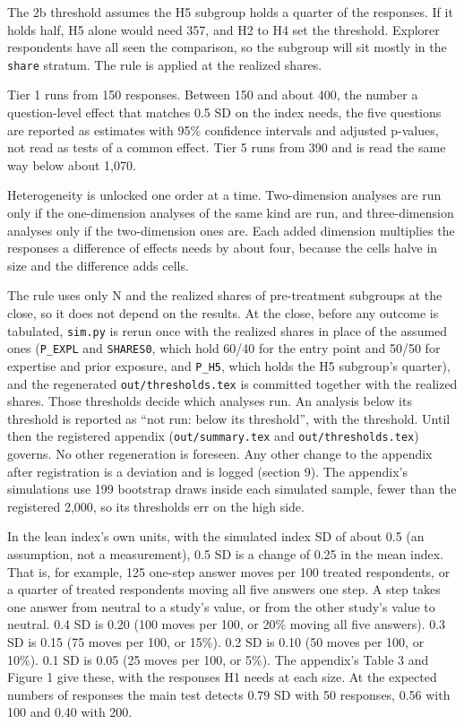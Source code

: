 The 2b threshold assumes the H5 subgroup holds a quarter of the responses. If it holds half, H5
alone would need 357, and H2 to H4 set the threshold. Explorer respondents have all seen the comparison, so the subgroup will sit
mostly in the \texttt{share} stratum. The rule is applied at the realized shares.

Tier 1 runs from 150 responses. Between 150 and about 400, the number a question-level effect that
matches 0.5 SD on the index needs, the five questions are reported as estimates with 95\%
confidence intervals and adjusted p-values, not read as tests of a common effect. Tier 5 runs from
390 and is read the same way below about 1,070.

Heterogeneity is unlocked one order at a time. Two-dimension analyses are run only if the
one-dimension analyses of the same kind are run, and three-dimension analyses only if the
two-dimension ones are. Each added dimension multiplies the responses a difference of effects
needs by about four, because the cells halve in size and the difference adds cells.

The rule uses only N and the realized shares of pre-treatment subgroups at the close, so it does
not depend on the results. At the close, before any outcome is tabulated, \texttt{sim.py} is rerun once
with the realized shares in place of the assumed ones (\texttt{P\_EXPL} and \texttt{SHARES0}, which hold 60/40
for the entry point and 50/50 for expertise and prior exposure, and \texttt{P\_H5}, which holds the H5
subgroup's quarter), and
the regenerated \texttt{out/thresholds.tex} is committed together with the realized shares. Those
thresholds decide which analyses run. An analysis below its threshold is reported as ``not run:
below its threshold'', with the threshold. Until then the registered appendix (\texttt{out/summary.tex}
and \texttt{out/thresholds.tex}) governs. No other regeneration is foreseen. Any other change to the
appendix after registration is a deviation and is logged (section 9). The appendix's simulations
use 199 bootstrap draws inside each simulated sample, fewer than the registered 2,000, so its
thresholds err on the high side.

In the lean index's own units, with the simulated index SD of about 0.5 (an assumption, not a
measurement), 0.5 SD is a change of 0.25 in the mean index. That is, for example, 125 one-step
answer moves per 100 treated respondents, or a quarter of treated respondents moving all five
answers one step. A step takes one answer from neutral to a study's value, or from the other
study's value to neutral. 0.4 SD is 0.20
(100 moves per 100, or 20\% moving all five answers). 0.3 SD is 0.15 (75 moves per 100, or 15\%).
0.2 SD is 0.10 (50 moves per 100, or 10\%). 0.1 SD is 0.05 (25 moves per 100, or 5\%). The
appendix's Table 3 and Figure 1 give these, with the responses H1 needs at each size. At the
expected numbers of responses the main test detects 0.79 SD with 50 responses, 0.56 with 100 and
0.40 with 200.

